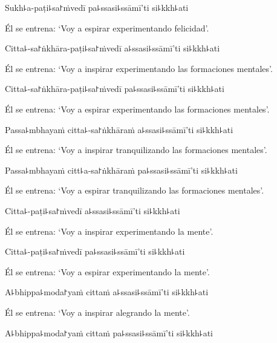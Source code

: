 Sukh꜕a-paṭi꜕sa꜓ṁvedī pa꜕ssasi꜕ssāmī'ti si꜕kkh꜕ati

\begin{english}
  Él se entrena: ‘Voy a espirar experimentando felicidad’.
\end{english}

Citta꜕-sa꜓ṅkhāra-paṭi꜕sa꜓ṁvedī a꜕ssasi꜕ssāmī'ti si꜕kkh꜕ati

\begin{english}
  Él se entrena: ‘Voy a inspirar experimentando las formaciones mentales’.
\end{english}

Citta꜕-sa꜓ṅkhāra-paṭi꜕sa꜓ṁvedī pa꜕ssasi꜕ssāmī'ti si꜕kkh꜕ati

\begin{english}
  Él se entrena: ‘Voy a espirar experimentando las formaciones mentales’.
\end{english}

Passa꜕mbhayaṁ citta꜕-sa꜓ṅkhāraṁ a꜕ssasi꜕ssāmī'ti si꜕kkh꜕ati

\begin{english}
  Él se entrena: ‘Voy a inspirar tranquilizando las formaciones mentales’.
\end{english}

Passa꜕mbhayaṁ citt꜕a-sa꜓ṅkhāraṁ pa꜕ssasi꜕ssāmī'ti si꜕kkh꜕ati

\begin{english}
  Él se entrena: ‘Voy a espirar tranquilizando las formaciones mentales’.
\end{english}

Citta꜕-paṭi꜕sa꜓ṁvedī a꜕ssasi꜕ssāmī'ti si꜕kkh꜕ati

\begin{english}
  Él se entrena: ‘Voy a inspirar experimentando la mente’.
\end{english}

Citta꜕-paṭi꜕sa꜓ṁvedī pa꜕ssasi꜕ssāmī'ti si꜕kkh꜕ati

\begin{english}
  Él se entrena: ‘Voy a espirar experimentando la mente’.
\end{english}

A꜕bhippa꜕moda꜓yaṁ cittaṁ a꜕ssasi꜕ssāmī'ti si꜕kkh꜕ati

\begin{english}
  Él se entrena: ‘Voy a inspirar alegrando la mente’.
\end{english}

A꜕bhippa꜕moda꜓yaṁ cittaṁ pa꜕ssasi꜕ssāmī'ti si꜕kkh꜕ati

